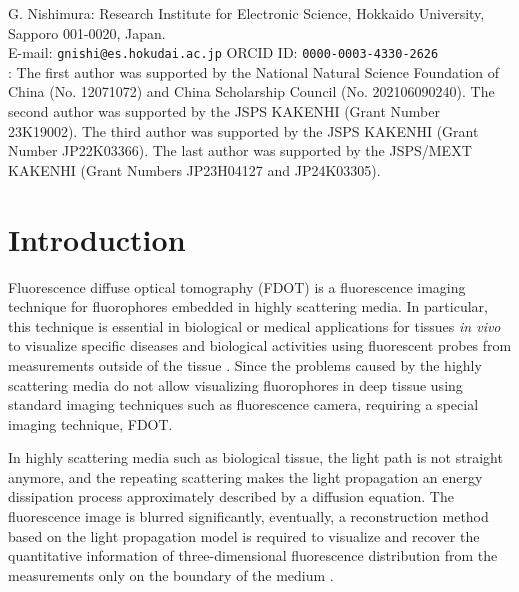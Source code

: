 \documentclass[10pt]{article}
\numberwithin{equation}{section}
\numberwithin{figure}{section}
\begin{document}
\noindent G. Nishimura:  
Research Institute for Electronic Science, Hokkaido University, Sapporo 001-0020, Japan.\\
\noindent 
E-mail: {\tt gnishi@es.hokudai.ac.jp} \;
ORCID ID: {\tt 0000-0003-4330-2626}\\

:
The first author was supported by the National Natural Science Foundation of China (No. 12071072) and China Scholarship Council (No. 202106090240). The second author was supported by the JSPS KAKENHI (Grant Number 23K19002).
The third author was supported by the JSPS KAKENHI (Grant Number JP22K03366).
The last author was supported by the JSPS/MEXT KAKENHI (Grant Numbers JP23H04127 and JP24K03305).

\newpage
\section{Introduction}
Fluorescence diffuse optical tomography (FDOT) is a fluorescence imaging technique for fluorophores embedded in highly scattering media. In particular, this technique is essential in biological or medical applications for tissues \textit{in vivo} to visualize specific diseases and biological activities using fluorescent probes from measurements outside of the tissue \cite{Ammari2020, Mycek2004, Vasilis2002}. Since the problems caused by the highly scattering media do not allow visualizing fluorophores in deep tissue using standard imaging techniques such as fluorescence camera, requiring a special imaging technique, FDOT. 
\begin{comment}
This imaging technique is also called fluorescence molecular tomography (FMT) and is categorized as a kind of diffuse optical tomography (DOT) using fluorescence. 
\end{comment}
In highly scattering media such as biological tissue, the light path is not straight anymore, and the repeating scattering makes the light propagation an energy dissipation process approximately described by a diffusion equation. 
The fluorescence image is blurred significantly, 
eventually, a reconstruction method based on the light propagation model is required to visualize and recover the quantitative information of three-dimensional fluorescence distribution from the measurements only on the boundary of the medium \cite{Jiang2011, Jiang2022}. 
\begin{comment}
The FDOT is categorized by the measurement data types \cite{Hebden1997, Hoshi2016}, such as the steady-state fluorescence intensity (CW method)\cite{Herve2011, Ducros2011}, the temporal response function of the fluorescence intensity (time-domain method)\cite{Lam2005, Nishimura2017}, the phase and demodulation of the fluorescence intensity (frequency-domain method)\cite{Ammari2014, Milstein2003} and a hybrid method of them \cite{Papadimitriou2020}. 
We choose the time-domain method because the temporal response function has direct information on the distribution of optical paths determined by the geometry, the position of the injection point of the excitation light, the distribution of the fluorophores, and the detection point of the fluorescence. 
\end{comment}
\end{document}

